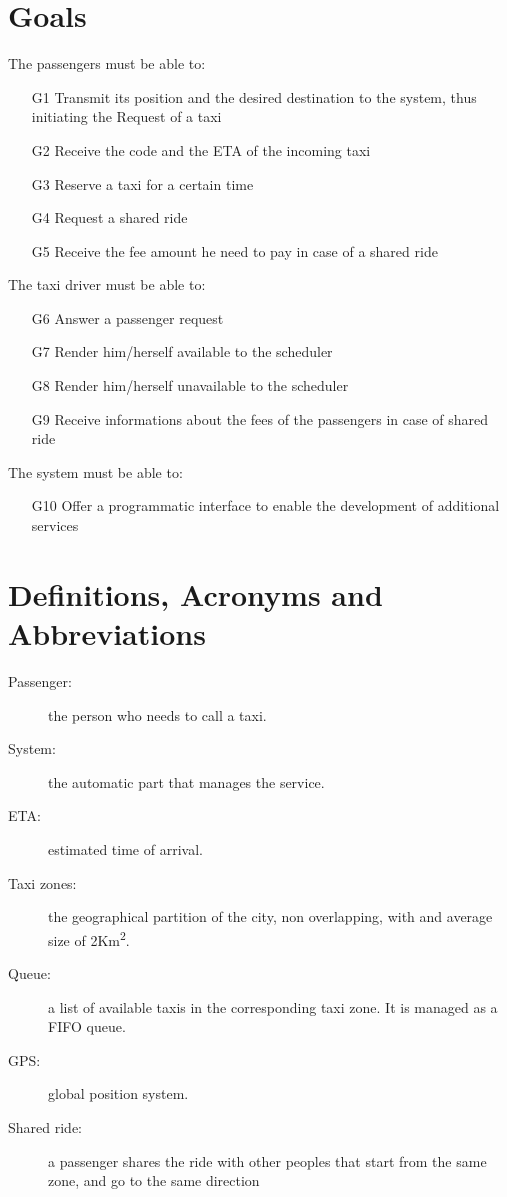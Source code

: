 \documentclass[a4paper,11pt]{report}
\begin{document}
\section{Goals}
The passengers must be able to:
\begin{itemize}
  \item [G1] Transmit its position and the desired destination to the system, thus initiating the Request of a taxi
  \item [G2] Receive the code and the ETA of the incoming taxi
  \item [G3] Reserve a taxi for a certain time
  \item [G4] Request a shared ride
  \item [G5] Receive the fee amount he need to pay in case of a shared ride
\end{itemize}
The taxi driver must be able to:
\begin{itemize}
  \item [G6] Answer a passenger request
  \item [G7] Render him/herself available to the scheduler
  \item [G8] Render him/herself unavailable to the scheduler
  \item [G9] Receive informations about the fees of the passengers in case of shared ride
\end{itemize}
The system must be able to:
\begin{itemize}
  \item [G10] Offer a programmatic interface to enable the development of additional services\\
\end{itemize}
\section{Definitions, Acronyms and Abbreviations}
\begin{description}
  \item[Passenger:] the person who needs to call a taxi.
  \item[System:] the automatic part that manages the service.  %
  \item[ETA:] estimated time of arrival.
  \item[Taxi zones:] the geographical partition of the city, non overlapping, with and average size of 2Km\textsuperscript{2}.
  \item[Queue:] a list of available taxis in the corresponding taxi zone. It is managed as a FIFO queue.
  \item[GPS:] global position system.
  \item[Shared ride:] a passenger shares the ride with other peoples that start from the same zone, and go to the same direction\\
\end{description}
 
\end{document}

